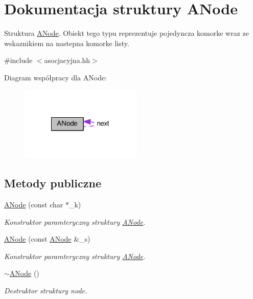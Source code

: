\hypertarget{struct_a_node}{\section{Dokumentacja struktury A\-Node}
\label{struct_a_node}
}


Struktura \hyperlink{struct_a_node}{A\-Node}. Obiekt tego typu reprezentuje pojedyncza komorke wraz ze wskaznikiem na nastepna komorke listy.  




{\ttfamily \#include $<$asocjacyjna.\-hh$>$}



Diagram współpracy dla A\-Node\-:\nopagebreak
\begin{figure}[H]
\begin{center}
\leavevmode
\includegraphics[width=165pt]{struct_a_node__coll__graph}
\end{center}
\end{figure}
\subsection*{Metody publiczne}
\begin{DoxyCompactItemize}
\item 
\hyperlink{struct_a_node_ad12f3f4440ad56e7e90d5ac927ba096a}{A\-Node} (const char $\ast$\-\_\-k)
\begin{DoxyCompactList}\small\item\em Konstruktor paramteryczny struktury \hyperlink{struct_a_node}{A\-Node}. \end{DoxyCompactList}\item 
\hyperlink{struct_a_node_a8fd9487184ba1af2150456919869cd60}{A\-Node} (const \hyperlink{struct_a_node}{A\-Node} \&\-\_\-s)
\begin{DoxyCompactList}\small\item\em Konstruktor paramteryczny struktury \hyperlink{struct_a_node}{A\-Node}. \end{DoxyCompactList}\item 
\hyperlink{struct_a_node_aec880ec60e95396aba5ffdc6ce0a4e8d}{$\sim$\-A\-Node} ()
\begin{DoxyCompactList}\small\item\em Destruktor struktury node. \end{DoxyCompactList}\end{DoxyCompactItemize}
